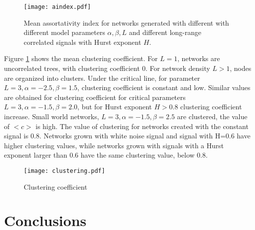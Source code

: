 \begin{figure}[h]
	\centering
	\texttt{[image: aindex.pdf]}
	\caption{Mean assortativity index for networks generated with different with different model parameters $\alpha, \beta, L$ and different long-range correlated signals with Hurst exponent $H$.}
	\label{fig:aindex}
\end{figure} 

Figure \ref{fig:aindex} shows the mean clustering coefficient. For $L=1$, networks are uncorrelated trees, with clustering coefficient $0$. For network density $L>1$, nodes are organized into clusters. Under the critical line, for parameter  $L=3, \alpha=-2.5, \beta=1.5 $, clustering coefficient is constant and low. Similar values are obtained for clustering coefficient for critical parameters $L=3, \alpha=-1.5, \beta=2.0$, but for Hurst exponent $H>0.8$ clustering coefficient increase. Small world networks,  $L=3, \alpha=-1.5, \beta=2.5$ are clustered, the value of $<c>$ is high.  The value of clustering for networks created with the constant signal is 0.8. Networks grown with white noise signal and signal with H=0.6 have higher clustering values, while networks grown with signals with a Hurst exponent larger than 0.6 have the same clustering value, below 0.8. 

\begin{figure}[h]
	\centering

	\texttt{[image: clustering.pdf]}
	\caption{Clustering coefficient}
	\label{fig:clustering}
\end{figure} 

\section{Conclusions}



